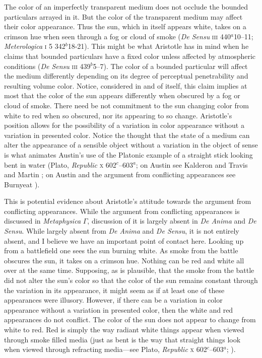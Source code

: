 The color of an imperfectly transparent medium does not occlude the bound\-ed particulars arrayed in it. But the color of the transparent medium may affect their color appearance. Thus the sun, which in itself appears white, takes on a crimson hue when seen through a fog or cloud of smoke (\emph{De Sensu} \textsc{iii} 440\( ^{a} \)10--11; \emph{Meterologica} \textsc{i} 5 342\( ^{b} \)18-21). This might be what Aristotle has in mind when he claims that bounded particulars have a fixed color unless affected by atmospheric conditions (\emph{De Sensu} \textsc{iii} 439\( ^{b} \)5--7). The color of a bounded particular will affect the medium differently depending on its degree of perceptual penetrability and resulting volume color. Notice, considered in and of itself, this claim implies at most that the color of the sun appears differently when obscured by a fog or cloud of smoke. There need be not commitment to the sun changing color from white to red when so obscured, nor its appearing to so change. Aristotle's position allows for the possibility of a variation in color appearance without a variation in presented color. Notice the thought that the state of a medium can alter the appearance of a sensible object without a variation in the object of sense is what animates Austin's \citeyearpar{Austin:1962lr} use of the Platonic example of a straight stick looking bent in water (Plato, \emph{Republic} \textsc{x} 602\( ^{c} \)--603\( ^{a} \); on Austin see Kalderon and Travis \citeyear{Kalderon:2010fk} and Martin \citeyear{Martin:2000nx}; on Austin and the argument from conflicting appearances see Burnyeat \citeyear{Burnyeat:1979mv}).

This is potential evidence about Aristotle's attitude towards the argument from conflicting appearances. While the argument from conflicting appearances is discussed in \emph{Metaphysica} \( \Gamma \), discussion of it is largely absent in \emph{De Anima} and \emph{De Sensu}. While largely absent from \emph{De Anima} and \emph{De Sensu}, it is not entirely absent, and I believe we have an important point of contact here. Looking up from a battlefield one sees the sun burning white. As smoke from the battle obscures the sun, it takes on a crimson hue. Nothing can be red and white all over at the same time. Supposing, as is plausible, that the smoke from the battle did not alter the sun's color so that the color of the sun remains constant through the variation in its appearance, it might seem as if at least one of these appearances were illusory. However, if there can be a variation in color appearance without a variation in presented color, then the white and red appearances do not conflict. The color of the sun does not appear to change from white to red. Red is simply the way radiant white things appear when viewed through smoke filled media (just as bent is the way that straight things look when viewed through refracting media---see Plato, \emph{Republic} \textsc{x} 602\( ^{c} \)--603\( ^{a} \); \citealt{Austin:1962lr}). 

